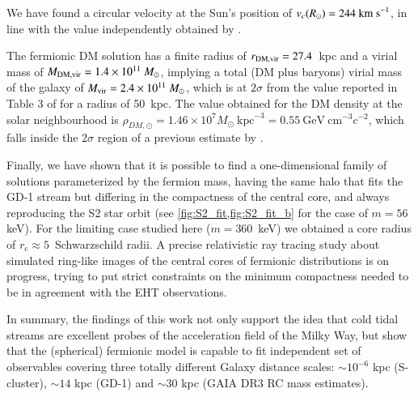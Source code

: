 \documentclass[twocolumn]{aa}
\begin{document}
We have found a circular velocity at the Sun's position of $v_c(R_\odot)= 244~\rm{km~s}^{-1}$, in line with the value independently obtained by \citet{2019MNRAS.486.2995M}.

The fermionic DM solution has a finite radius of $r_{\rm{DM,vir}}=27.4$~kpc and a virial mass of
$M_{\rm{DM,vir}}=1.4\times10^{11}~M_\odot$, implying a total (DM plus baryons) virial mass of the galaxy of $M_{\rm{vir}}= 2.4\times10^{11}~M_\odot$, which is at $2\sigma$ from the value reported in Table 3 of
\citet{2014MNRAS.445.3788G} for a radius of 50~kpc. The value obtained for the DM density at the solar neighbourhood is $\rho_{DM,\odot}=1.46\times10^7M_\odot~\mathrm{kpc}^{-3}=0.55~\mathrm{GeV}~\mathrm{cm}^{-3} c^{-2}$, which falls inside the $2\sigma$ region of a previous estimate by \citet{Salucci2010}.

Finally, we have shown that it is possible to find a one-dimensional family of solutions parameterized by the fermion mass, having the same halo that fits the GD-1 stream but differing in the compactness of the central core, and always reproducing the S2 star orbit (see \cref{fig:S2_fit,fig:S2_fit_b} for the case of $m=56$ keV). For the limiting case studied here ($m=360$~keV) we obtained a core radius of $r_\mathrm{c}\approx5$~Schwarzschild radii.
A precise relativistic ray tracing study about simulated ring-like images of the central
cores of fermionic distributions is on progress, trying to put strict constraints on the minimum
compactness needed to be in agreement with the EHT observations.

In summary, the findings of this work not only support the idea that cold tidal streams are excellent probes of the acceleration field of the Milky Way, but show that the (spherical) fermionic model is capable to fit independent set of observables covering three totally different Galaxy distance scales: $\sim 10^{-6}$ kpc (S-cluster), $\sim 14$ kpc (GD-1) and $\sim 30$ kpc (GAIA DR3 RC mass estimates).
\end{document}
